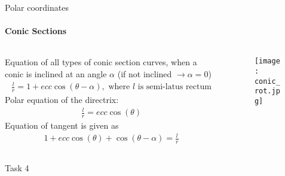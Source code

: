 \documentclass[aspectratio=169]{beamer}
\begin{document}
\begin{frame}[t]{Polar coordinates}
\framesubtitle{Conic Sections}
\footnotesize
    \begin{columns}[T,onlytextwidth]
        \begin{column}{0.49\textwidth}
            Equation of all types of conic section curves, when a conic is inclined at an angle $\alpha$ (if not inclined $\rightarrow \alpha=0$)
            \begin{align*}
                \frac{l}{r}=1+ecc\cos({\theta}-\alpha), \text{ where $l$ is semi-latus rectum}
            \end{align*}
            Polar equation of the directrix:
            \begin{align*}
                \frac{l}{r}=ecc\cos({\theta})
            \end{align*}
            Equation of tangent is given as
            \begin{align*}
                1+ ecc\cos({\theta}) + \cos(\theta-\alpha)=\frac{l}{r}
            \end{align*}
        \end{column}
        \begin{column}{0.49\textwidth}
            \begin{figure}[H]
                \centering\texttt{[image: conic\_rot.jpg]}
                \label{fig:conic_rot.jpg}
            \end{figure}
        \end{column}
    \end{columns}
\end{frame}

\begin{frame}[t]{Task 4}
    \framesubtitle{}
\end{frame}
\end{document}
